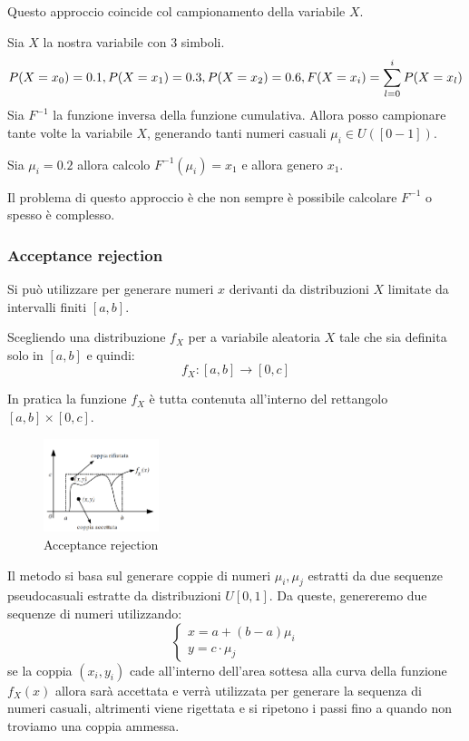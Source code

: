 Questo approccio coincide col campionamento della variabile $X$.
\begin{esempio}
    Sia $X$ la nostra variabile con $3$ simboli.
    \begin{equation*}
        P(X = x_0) = 0.1, \space P(X = x_1) = 0.3, \space P(X = x_2) = 0.6,
        F(X = x_i) = \sum_{l=0}^{i} P(X = x_l)
    \end{equation*}
    Sia $F^{-1}$ la funzione inversa della funzione cumulativa. Allora posso
    campionare tante volte la variabile $X$, generando tanti numeri casuali
    $\mu_i \in U([0-1])$.

    Sia $\mu_i = 0.2$ allora calcolo $F^{-1}(\mu_i) = x_1$ e allora genero $x_1$.
\end{esempio}
Il problema di questo approccio è che non sempre è possibile calcolare $F^{-1}$ o
spesso è complesso.
\subsubsection{Acceptance rejection}
Si può utilizzare per generare numeri $x$ derivanti da distribuzioni $X$ limitate
da intervalli finiti $[a,b]$.

Scegliendo una distribuzione $f_X$ per a variabile aleatoria $X$ tale che sia
definita solo in $[a,b]$ e quindi:
\begin{equation}
    f_X : [a,b] \rightarrow [0,c]
\end{equation}
\begin{osservazione}
    In pratica la funzione $f_X$ è tutta contenuta all'interno del rettangolo
    $[a,b] \times [0,c]$.
\end{osservazione}
\begin{figure}[!ht]
    \centering
    \includegraphics[width=0.3\textwidth]{./img/Reti/acceptancerejection.png}
    \caption{Acceptance rejection}
    \label{fig:acceptance-rejection}
\end{figure}
Il metodo si basa sul generare coppie di numeri $\mu_i,\mu_j$ estratti da due
sequenze pseudocasuali estratte da distribuzioni $U[0, 1]$. Da queste, genereremo
due sequenze di numeri utilizzando:
\begin{equation}
    \begin{cases}
        x = a + (b-a)\mu_i \\
        y = c \cdot \mu_j
    \end{cases}
\end{equation}
se la coppia $(x_i, y_i)$ cade all'interno dell'area sottesa alla curva della
funzione $f_X(x)$ allora sarà accettata e verrà utilizzata per generare la sequenza
di numeri casuali, altrimenti viene rigettata e si ripetono i passi fino a quando
non troviamo una coppia ammessa.

